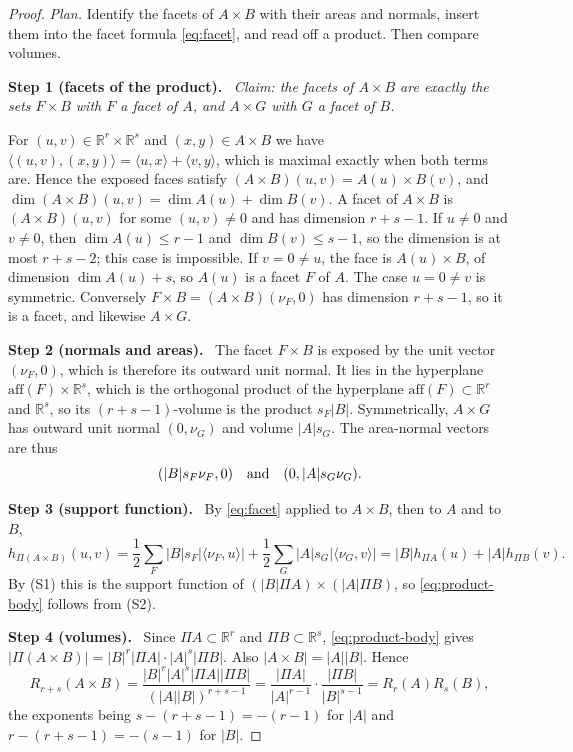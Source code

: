 \documentclass[11pt]{article}
\newcommand{\R}{\mathbb R}
\newcommand{\step}[1]{\par\smallskip\noindent\textbf{#1}\ }
\begin{document}
\begin{proof}
\emph{Plan.} Identify the facets of \(A\times B\) with their areas and
normals, insert them into the facet formula \eqref{eq:facet}, and read
off a product. Then compare volumes.

\step{Step 1 (facets of the product).} \emph{Claim: the facets of
\(A\times B\) are exactly the sets \(F\times B\) with \(F\) a facet of
\(A\), and \(A\times G\) with \(G\) a facet of \(B\).}

For \((u,v)\in\R^r\times\R^s\) and \((x,y)\in A\times B\) we have
\(\langle(u,v),(x,y)\rangle=\langle u,x\rangle+\langle v,y\rangle\),
which is maximal exactly when both terms are. Hence the exposed faces
satisfy \((A\times B)(u,v)=A(u)\times B(v)\), and
\(\dim(A\times B)(u,v)=\dim A(u)+\dim B(v)\). A facet of \(A\times B\)
is \((A\times B)(u,v)\) for some \((u,v)\ne0\) and has dimension
\(r+s-1\). If \(u\ne0\) and \(v\ne0\), then \(\dim A(u)\le r-1\) and
\(\dim B(v)\le s-1\), so the dimension is at most \(r+s-2\); this case
is impossible. If \(v=0\ne u\), the face is \(A(u)\times B\), of
dimension \(\dim A(u)+s\), so \(A(u)\) is a facet \(F\) of \(A\). The
case \(u=0\ne v\) is symmetric. Conversely
\(F\times B=(A\times B)(\nu_F,0)\) has dimension \(r+s-1\), so it is a
facet, and likewise \(A\times G\).

\step{Step 2 (normals and areas).} The facet \(F\times B\) is exposed
by the unit vector \((\nu_F,0)\), which is therefore its outward unit
normal. It lies in the hyperplane
\(\mathrm{aff}(F)\times\R^s\), which is the orthogonal product of the
hyperplane \(\mathrm{aff}(F)\subset\R^r\) and \(\R^s\), so its
\((r+s-1)\)-volume is the product \(s_F|B|\). Symmetrically,
\(A\times G\) has outward unit normal \((0,\nu_G)\) and volume
\(|A|s_G\). The area-normal vectors are thus
\[
 (|B|s_F\nu_F,0)
 \quad\hbox{and}\quad
 (0,|A|s_G\nu_G).
\]

\step{Step 3 (support function).} By \eqref{eq:facet} applied to
\(A\times B\), then to \(A\) and to \(B\),
\[
 h_{\Pi(A\times B)}(u,v)
 =\frac12\sum_F|B|s_F|\langle\nu_F,u\rangle|
  +\frac12\sum_G|A|s_G|\langle\nu_G,v\rangle|
 =|B|h_{\Pi A}(u)+|A|h_{\Pi B}(v).
\]
By (S1) this is the support function of
\((|B|\Pi A)\times(|A|\Pi B)\), so \eqref{eq:product-body} follows from
(S2).

\step{Step 4 (volumes).} Since \(\Pi A\subset\R^r\) and
\(\Pi B\subset\R^s\), \eqref{eq:product-body} gives
\(|\Pi(A\times B)|=|B|^r|\Pi A|\cdot|A|^s|\Pi B|\). Also
\(|A\times B|=|A||B|\). Hence
\[
 R_{r+s}(A\times B)
 =\frac{|B|^r|A|^s|\Pi A||\Pi B|}
         {(|A||B|)^{r+s-1}}
 =\frac{|\Pi A|}{|A|^{r-1}}
   \cdot\frac{|\Pi B|}{|B|^{s-1}}
 =R_r(A)R_s(B),
\]
the exponents being \(s-(r+s-1)=-(r-1)\) for \(|A|\) and
\(r-(r+s-1)=-(s-1)\) for \(|B|\).
\end{proof}
\end{document}
